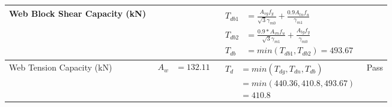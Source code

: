 \documentclass{article}%
\begin{document}
\begin{longtable}{|p{4cm}|p{6cm}|p{5.5cm}|p{1.5cm}|}
\hline%
Web Block Shear Capacity (kN)&&$\begin{aligned}T_{db1} &= \frac{A_{vg} f_{y}}{\sqrt{3} \gamma_{m0}} + \frac{0.9 A_{tn} f_{u}}{\gamma_{m1}}\\ T_{db2} &= \frac{0.9*A_{vn} f_{u}}{\sqrt{3} \gamma_{m1}} + \frac{A_{tg} f_{y}}{\gamma_{m0}}\\ T_{db} &= min(T_{db1}, T_{db2})= 493.67\end{aligned}$&\\%
\hline%
Web Tension Capacity (kN)&$\begin{aligned} A_w &=132.11\end{aligned}$&$\begin{aligned} T_d &= min(T_{dg},T_{dn},T_{db})\\ &= min(440.36,410.8,493.67)\\ &=410.8\end{aligned}$&Pass\\%
\hline%
\end{longtable}

%
\newpage%
\end{document}
